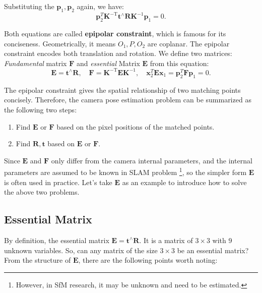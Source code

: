 Substituting the $\mathbf{p}_1, \mathbf{p}_2$ again, we have:
\begin{equation}
\mathbf{p}_2^T \mathbf{K}^{-\mathrm{T}} \mathbf{t}^\wedge \mathbf{R} \mathbf{K}^{-1} \mathbf{p}_1  = 0.
\end{equation}

Both equations are called \textbf{epipolar constraint}, which is famous for its conciseness. Geometrically, it means $O_1, P, O_2$ are coplanar. The epipolar constraint encodes both translation and rotation. We define two matrices: \textit{Fundamental} matrix $\mathbf{F}$ and \textit{essential} Matrix $\mathbf{E}$ from this equation: 
\begin{equation}
\mathbf{E} = \mathbf{t}^ \wedge \mathbf{R}, \quad \mathbf{F} = \mathbf{K}^{ -\mathrm{T}} \mathbf{E} {\mathbf{K}^{ - 1}}, \quad \mathbf{x}_2^T \mathbf{E} {\mathbf{x}_1} = \mathbf{p}_2^T \mathbf{F} {\mathbf{p}_1} = 0.
\end{equation}

The epipolar constraint gives the spatial relationship of two matching points concisely. Therefore, the camera pose estimation problem can be summarized as the following two steps:

\begin{enumerate}
	\item Find $\mathbf{E}$ or $\mathbf{F}$ based on the pixel positions of the matched points.
	\item Find $\mathbf{R}, \mathbf{t}$ based on $\mathbf{E}$ or $\mathbf{F}$.
\end{enumerate}

Since $\mathbf{E}$ and $\mathbf{F}$ only differ from the camera internal parameters, and the internal parameters are assumed to be known in SLAM problem \footnote{However, in SfM research, it may be unknown and need to be estimated. }, so the simpler form $\mathbf{E}$ is often used in practice. Let's take $\mathbf{E}$ as an example to introduce how to solve the above two problems.

\subsection{Essential Matrix}
By definition, the essential matrix $\mathbf{E} = \mathbf{t}^\wedge \mathbf{R}$. It is a matrix of $3\times 3$ with 9 unknown variables. So, can any matrix of the size $3 \times 3$ be an essential matrix? From the structure of $\mathbf{E}$, there are the following points worth noting:

